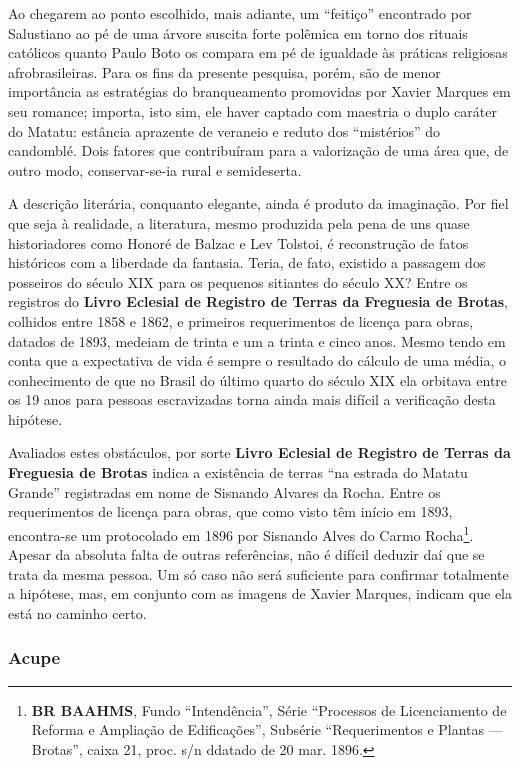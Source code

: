 Ao chegarem ao ponto escolhido, mais adiante, um ``feitiço'' encontrado por Salustiano ao pé de uma árvore suscita forte polêmica em torno dos rituais católicos quanto Paulo Boto os compara em pé de igualdade às práticas religiosas afrobrasileiras. Para os fins da presente pesquisa, porém, são de menor importância as estratégias do branqueamento promovidas por Xavier Marques em seu romance; importa, isto sim, ele haver captado com maestria o duplo caráter do Matatu: estância aprazente de veraneio e reduto dos ``mistérios'' do candomblé. Dois fatores que contribuíram para a valorização de uma área que, de outro modo, conservar-se-ia rural e semideserta.

A descrição literária, conquanto elegante, ainda é produto da imaginação. Por fiel que seja à realidade, a literatura, mesmo produzida pela pena de uns quase historiadores como Honoré de Balzac e Lev Tolstoi, é reconstrução de fatos históricos com a liberdade da fantasia. Teria, de fato, existido a passagem dos posseiros do século XIX para os pequenos sitiantes do século XX? Entre os registros do \textbf{Livro Eclesial de Registro de Terras da Freguesia de Brotas}, colhidos entre 1858 e 1862, e primeiros requerimentos de licença para obras, datados de 1893, medeiam de trinta e um a trinta e cinco anos. Mesmo tendo em conta que a expectativa de vida é sempre o resultado do cálculo de uma média, o conhecimento de que no Brasil do último quarto do século XIX ela orbitava entre os 19 anos para pessoas escravizadas \cite[p.~303]{schwartz_segredos_1988} torna ainda mais difícil a verificação desta hipótese.

Avaliados estes obstáculos, por sorte \textbf{Livro Eclesial de Registro de Terras da Freguesia de Brotas} indica a existência de terras ``na estrada do Matatu Grande'' registradas em nome de Sisnando Alvares da Rocha. Entre os requerimentos de licença para obras, que como visto têm início em 1893, encontra-se um protocolado em 1896 por Sisnando Alves do Carmo Rocha\footnote{\textbf{BR BAAHMS}, Fundo ``Intendência'', Série ``Processos de Licenciamento de Reforma e Ampliação de Edificações'', Subsérie ``Requerimentos e Plantas --- Brotas'', caixa 21, proc. s/n ddatado de 20 mar. 1896.}. Apesar da absoluta falta de outras referências, não é difícil deduzir daí que se trata da mesma pessoa. Um só caso não será suficiente para confirmar totalmente a hipótese, mas, em conjunto com as imagens de Xavier Marques, indicam que ela está no caminho certo.

\subsubsection{Acupe}\label{subsubsec:acupecap3}

